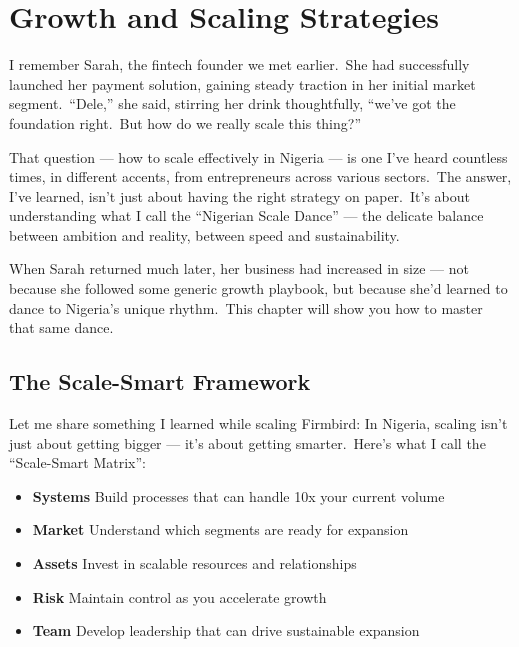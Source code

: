 \chapter{Growth and Scaling Strategies}\label{ch:growth-and-scaling-strategies}

I remember Sarah, the fintech founder we met earlier.\ She had successfully launched her payment solution, gaining steady traction in her initial market segment.\ ``Dele,'' she said, stirring her drink thoughtfully, ``we've got the foundation right.\ But how do we really scale this thing?''

That question --- how to scale effectively in Nigeria --- is one I've heard countless times, in different accents, from entrepreneurs across various sectors.\ The answer, I've learned, isn't just about having the right strategy on paper.\ It's about understanding what I call the ``Nigerian Scale Dance'' --- the delicate balance between ambition and reality, between speed and sustainability.

\begin{importantbox}
    When Sarah returned much later, her business had increased in size --- not because she followed some generic growth playbook, but because she'd learned to dance to Nigeria's unique rhythm.\ This chapter will show you how to master that same dance.
\end{importantbox}


\section{The Scale-Smart Framework}\label{sec:scale-smart-framework}

Let me share something I learned while scaling Firmbird: In Nigeria, scaling isn't just about getting bigger --- it's about getting smarter.\ Here's what I call the ``Scale-Smart Matrix'':

\begin{tcolorbox}[colback=white,colframe=primarydark,title=\textbf{Scale-Smart Components}]
    \begin{itemize}
        \item \textbf{Systems}
        Build processes that can handle 10x your current volume

        \item \textbf{Market}
        Understand which segments are ready for expansion

        \item \textbf{Assets}
        Invest in scalable resources and relationships

        \item \textbf{Risk}
        Maintain control as you accelerate growth

        \item \textbf{Team}
        Develop leadership that can drive sustainable expansion
    \end{itemize}
\end{tcolorbox}

